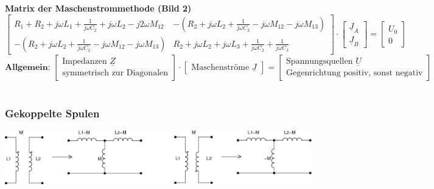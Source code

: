 \\ \\
\textbf{Matrix der Maschenstrommethode (Bild 2)}
$$\left[ \begin{array}{cc}
        R_1+R_2 +j \omega L_1 + \frac{1}{j \omega C_2} + j \omega L_2 - j 2
        \omega M_{12} 
    & -(R_2 + j \omega L_2 + \frac{1}{j \omega C_2} - j \omega M_{12} -
        j \omega M_{13}) \\
    -(R_2 + j \omega L_2 + \frac{1}{j \omega C_2} - j \omega M_{12} - j
        \omega M_{13})
    & R_2 + j \omega L_2 + j \omega L_3 + \frac{1}{j \omega C_2} +
        \frac{1}{j \omega C_3}
\end{array}\right] \cdot
\left[ \begin{array}{cc}
     \underline{J}_A \\ \underline{J}_B
     \end{array}\right] =
\left[ \begin{array}{cc}
     U_0 \\ 0
     \end{array}\right]$$
$$\textbf{Allgemein: }\left[ \begin{array}{cc}
       \text{Impedanzen $\underline{Z}$} \\
       \text{symmetrisch zur Diagonalen}
       \end{array}\right] \cdot \left[ \begin{array}{cc}
     \text{Maschenströme $\underline{J}$}
     \end{array}\right] =
\left[ \begin{array}{cc}
     \text{Spannungsquellen $\underline{U}$} \\
    \text{Gegenrichtung positiv, sonst negativ}
     \end{array}\right]$$\\

\subsubsection{Gekoppelte Spulen}
\begin{center}
\includegraphics[width=14cm]{./images/netzwerkanalyse-kopplung-spulen.png}
\end{center}

